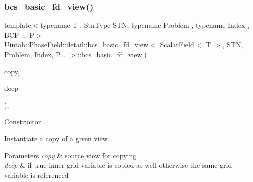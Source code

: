 \subsubsection{\texorpdfstring{bcs\+\_\+basic\+\_\+fd\+\_\+view()}{bcs\_basic\_fd\_view()}\hspace{0.1cm}{\footnotesize\ttfamily [1/4]}}
{\footnotesize\ttfamily template$<$typename T , Stn\+Type S\+TN, typename Problem , typename Index , B\+C\+F ... P$>$ \\
\hyperlink{classUintah_1_1PhaseField_1_1detail_1_1bcs__basic__fd__view}{Uintah\+::\+Phase\+Field\+::detail\+::bcs\+\_\+basic\+\_\+fd\+\_\+view}$<$ \hyperlink{structUintah_1_1PhaseField_1_1ScalarField}{Scalar\+Field}$<$ T $>$, S\+TN, \hyperlink{classUintah_1_1PhaseField_1_1Problem}{Problem}, Index, P... $>$\+::\hyperlink{classUintah_1_1PhaseField_1_1detail_1_1bcs__basic__fd__view}{bcs\+\_\+basic\+\_\+fd\+\_\+view} (\begin{DoxyParamCaption}\item[{const \hyperlink{classUintah_1_1PhaseField_1_1detail_1_1bcs__basic__fd__view}{bcs\+\_\+basic\+\_\+fd\+\_\+view}$<$ \hyperlink{structUintah_1_1PhaseField_1_1ScalarField}{Scalar\+Field}$<$ T $>$, S\+TN, \hyperlink{classUintah_1_1PhaseField_1_1Problem}{Problem}, Index, P... $>$ $\ast$}]{copy,  }\item[{bool}]{deep }\end{DoxyParamCaption})\hspace{0.3cm}{\ttfamily [inline]}, {\ttfamily [protected]}}



Constructor. 

Instantiate a copy of a given view


\begin{DoxyParams}{Parameters}
{\em copy} & source view for copying \\
\hline
{\em deep} & if true inner grid variable is copied as well otherwise the same grid variable is referenced \\
\hline
\end{DoxyParams}
\mbox{\label{classUintah_1_1PhaseField_1_1detail_1_1bcs__basic__fd__view_3_01ScalarField_3_01T_01_4_00_01STN_07caa9955adf783da0505eac75e76f08_a1b5f0227833fd0dc7da0ec1c45d97eb8}} 
